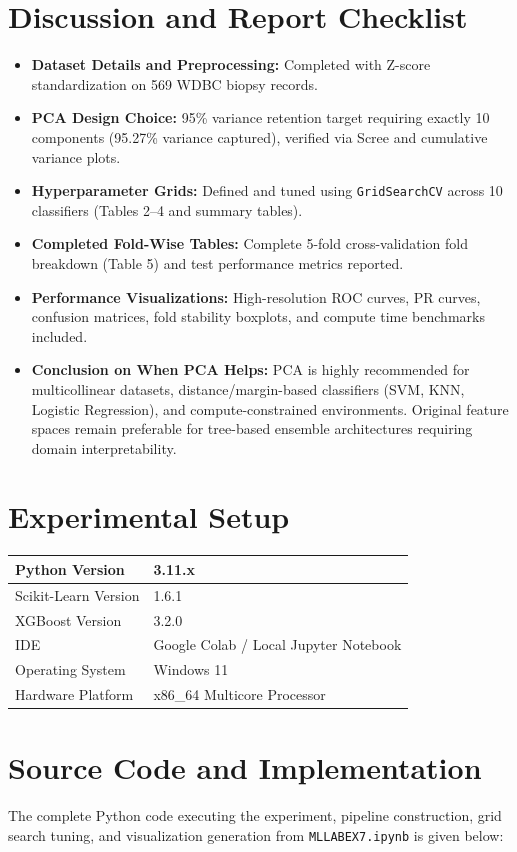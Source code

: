 \documentclass[12pt,a4paper]{article}
\begin{document}
\section{Discussion and Report Checklist}
\begin{itemize}
    \item \textbf{Dataset Details and Preprocessing:} Completed with Z-score standardization on 569 WDBC biopsy records.
    \item \textbf{PCA Design Choice:} 95\% variance retention target requiring exactly 10 components (95.27\% variance captured), verified via Scree and cumulative variance plots.
    \item \textbf{Hyperparameter Grids:} Defined and tuned using \texttt{GridSearchCV} across 10 classifiers (Tables 2--4 and summary tables).
    \item \textbf{Completed Fold-Wise Tables:} Complete 5-fold cross-validation fold breakdown (Table 5) and test performance metrics reported.
    \item \textbf{Performance Visualizations:} High-resolution ROC curves, PR curves, confusion matrices, fold stability boxplots, and compute time benchmarks included.
    \item \textbf{Conclusion on When PCA Helps:} PCA is highly recommended for multicollinear datasets, distance/margin-based classifiers (SVM, KNN, Logistic Regression), and compute-constrained environments. Original feature spaces remain preferable for tree-based ensemble architectures requiring domain interpretability.
\end{itemize}

\section{Experimental Setup}
\begin{longtable}{|p{6cm}|p{8cm}|}
\hline
Python Version & 3.11.x\\ \hline
Scikit-Learn Version & 1.6.1\\ \hline
XGBoost Version & 3.2.0\\ \hline
IDE & Google Colab / Local Jupyter Notebook\\ \hline
Operating System & Windows 11\\ \hline
Hardware Platform & x86\_64 Multicore Processor\\ \hline
\end{longtable}

\section{Source Code and Implementation}
The complete Python code executing the experiment, pipeline construction, grid search tuning, and visualization generation from \texttt{MLLABEX7.ipynb} is given below:
\end{document}

